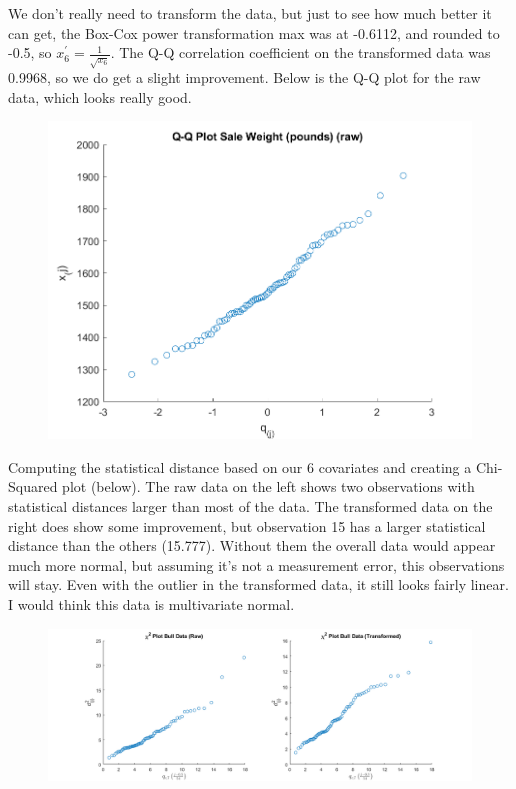 We don't really need to transform the data, but just to see how much better it can get, the Box-Cox power transformation max was at -0.6112, and rounded to -0.5, so $x_{6}^{\prime} = \frac{1}{\sqrt{x_{6}}}$. The Q-Q correlation coefficient on the transformed data was 0.9968, so we do get a slight improvement. Below is the Q-Q plot for the raw data, which looks really good.

\begin{center}
    \begin{figure}[H]
        \centering
        \includegraphics[scale=0.6]{./matlab/chapter-4/sol4.38.qq.6.png}
    \end{figure}
\end{center}

Computing the statistical distance based on our 6 covariates and creating a Chi-Squared plot (below). The raw data on the left shows two observations with statistical distances larger than most of the data. The transformed data on the right does show some improvement, but observation 15 has a larger statistical distance than the others (15.777). Without them the overall data would appear much more normal, but assuming it's not a measurement error, this observations will stay. Even with the outlier in the transformed data, it still looks fairly linear. I would think this data is multivariate normal.

\begin{center}
    \begin{figure}[H]
        \centering
        \includegraphics[scale=0.4]{./matlab/chapter-4/sol4.38.chi2.png}
    \end{figure}
\end{center}
